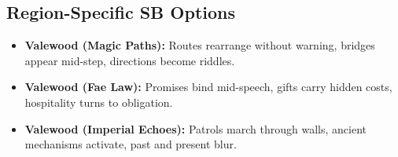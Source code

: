 \subsection*{Region-Specific SB Options}
\begin{itemize}
\item \textbf{Valewood (Magic Paths):} Routes rearrange without warning, bridges appear mid-step, directions become riddles.
\item \textbf{Valewood (Fae Law):} Promises bind mid-speech, gifts carry hidden costs, hospitality turns to obligation.
\item \textbf{Valewood (Imperial Echoes):} Patrols march through walls, ancient mechanisms activate, past and present blur.
\end{itemize}
